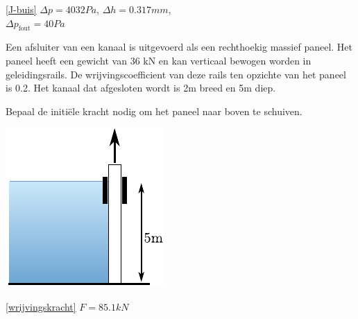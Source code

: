 \begin{antwoord}{\ref{J-buis}}
	$\Delta p = 4032 \unit{Pa}$, $\Delta h = 0.317 \unit{mm}$,\\ $\Delta p_{\text{fout}} = 40 \unit{Pa}$
\end{antwoord}
\begin{toepassing}[*]
	\label{wrijvingskracht}
Een afsluiter van een kanaal is uitgevoerd als een rechthoekig massief paneel. Het paneel heeft een gewicht van 36 kN en kan verticaal bewogen worden in geleidingsrails. De wrijvingscoefficient van deze rails ten opzichte van het paneel is 0.2. Het kanaal dat afgesloten wordt is 2m breed en 5m diep.
		
Bepaal de initiële kracht nodig om het paneel naar boven te schuiven.

	\centering
	\includegraphics{fig/hydrostatica/wrijvingskracht}
\end{toepassing}
\begin{antwoord}{\ref{wrijvingskracht}}
	$F = 85.1 \unit{kN}$
\end{antwoord}

